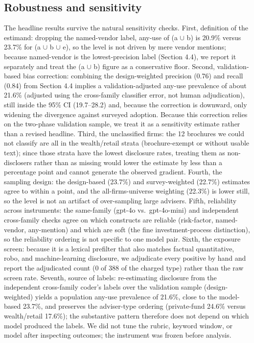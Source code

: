 \documentclass[utf8]{FrontiersinHarvard} %
\begin{document}
\subsection{Robustness and sensitivity}
The headline results survive the natural sensitivity checks. First, definition of the estimand: dropping the named-vendor label, any-use of (a $\cup$ b) is 20.9\% versus 23.7\% for (a $\cup$ b $\cup$ e), so the level is not driven by mere vendor mentions; because named-vendor is the lowest-precision label (Section 4.4), we report it separately and treat the (a $\cup$ b) figure as a conservative floor. Second, validation-based bias correction: combining the design-weighted precision (0.76) and recall (0.84) from Section 4.4 implies a validation-adjusted any-use prevalence of about 21.6\% (adjusted using the cross-family classifier error, not human adjudication), still inside the 95\% CI (19.7--28.2) and, because the correction is downward, only widening the divergence against surveyed adoption. Because this correction relies on the two-phase validation sample, we treat it as a sensitivity estimate rather than a revised headline. Third, the unclassified firms: the 12 brochures we could not classify are all in the wealth/retail strata (brochure-exempt or without usable text); since those strata have the lowest disclosure rates, treating them as non-disclosers rather than as missing would lower the estimate by less than a percentage point and cannot generate the observed gradient. Fourth, the sampling design: the design-based (23.7\%) and survey-weighted (22.7\%) estimates agree to within a point, and the all-firms-universe weighting (22.3\%) is lower still, so the level is not an artifact of over-sampling large advisers. Fifth, reliability across instruments: the same-family (gpt-4o vs.\ gpt-4o-mini) and independent cross-family checks agree on which constructs are reliable (risk-factor, named-vendor, any-mention) and which are soft (the fine investment-process distinction), so the reliability ordering is not specific to one model pair. Sixth, the exposure screen: because it is a lexical prefilter that also matches factual quantitative, robo, and machine-learning disclosure, we adjudicate every positive by hand and report the adjudicated count (0 of 388 of the charged type) rather than the raw screen rate. Seventh, source of labels: re-estimating disclosure from the independent cross-family coder's labels over the validation sample (design-weighted) yields a population any-use prevalence of 21.6\%, close to the model-based 23.7\%, and preserves the adviser-type ordering (private-fund 24.6\% versus wealth/retail 17.6\%); the substantive pattern therefore does not depend on which model produced the labels. We did not tune the rubric, keyword window, or model after inspecting outcomes; the instrument was frozen before analysis.
\end{document}

